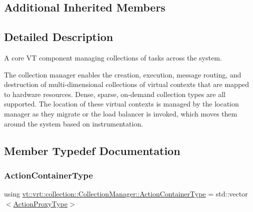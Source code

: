 \subsection*{Additional Inherited Members}


\subsection{Detailed Description}
A core VT component managing collections of tasks across the system. 

The collection manager enables the creation, execution, message routing, and destruction of multi-\/dimensional collections of virtual contexts that are mapped to hardware resources. Dense, sparse, on-\/demand collection types are all supported. The location of these virtual contexts is managed by the location manager as they migrate or the load balancer is invoked, which moves them around the system based on instrumentation. 

\subsection{Member Typedef Documentation}
\mbox{\label{structvt_1_1vrt_1_1collection_1_1_collection_manager_a536805fb5c58b557b66e7d7febe87567}} 
\subsubsection{\texorpdfstring{Action\+Container\+Type}{ActionContainerType}}
{\footnotesize\ttfamily using \hyperlink{structvt_1_1vrt_1_1collection_1_1_collection_manager_a536805fb5c58b557b66e7d7febe87567}{vt\+::vrt\+::collection\+::\+Collection\+Manager\+::\+Action\+Container\+Type} =  std\+::vector$<$\hyperlink{structvt_1_1vrt_1_1collection_1_1_collection_manager_a98a759caf144277dcd341cdbd5538f59}{Action\+Proxy\+Type}$>$}

\mbox{\label{structvt_1_1vrt_1_1collection_1_1_collection_manager_a2649daab7b437e1e2bdb5f2eefff29b6}} 
